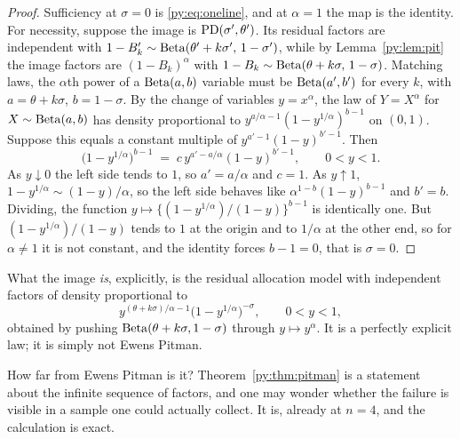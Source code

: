 \begin{proof}
Sufficiency at $\sigma = 0$ is \eqref{py:eq:oneline}, and at $\alpha = 1$ the map is the identity. For
necessity, suppose the image is $\mathrm{PD}(\sigma',\theta')$. Its residual factors are independent with
$1-B'_k \sim \mathrm{Beta}(\theta'+k\sigma',\,1-\sigma')$, while by Lemma~\ref{py:lem:pit} the image factors
are $(1-B_k)^{\alpha}$ with $1-B_k \sim \mathrm{Beta}(\theta+k\sigma,\,1-\sigma)$. Matching laws, the
$\alpha$th power of a $\mathrm{Beta}(a,b)$ variable must be $\mathrm{Beta}(a',b')$ for every $k$, with
$a = \theta+k\sigma$, $b = 1-\sigma$. By the change of variables $y = x^{\alpha}$, the law of
$Y = X^{\alpha}$ for $X \sim \mathrm{Beta}(a,b)$ has density proportional to
$y^{a/\alpha-1}(1-y^{1/\alpha})^{b-1}$ on $(0,1)$. Suppose this equals a constant multiple of
$y^{a'-1}(1-y)^{b'-1}$. Then
\[
\big(1-y^{1/\alpha}\big)^{b-1} \;=\; c\,y^{a'-a/\alpha}(1-y)^{b'-1},
\qquad 0 < y < 1 .
\]
As $y \downarrow 0$ the left side tends to $1$, so $a' = a/\alpha$ and $c = 1$. As $y \uparrow 1$,
$1-y^{1/\alpha} \sim (1-y)/\alpha$, so the left side behaves like $\alpha^{1-b}(1-y)^{b-1}$ and
$b' = b$. Dividing, the function $y \mapsto \{(1-y^{1/\alpha})/(1-y)\}^{b-1}$ is identically one. But
$(1-y^{1/\alpha})/(1-y)$ tends to $1$ at the origin and to $1/\alpha$ at the other end, so for
$\alpha \ne 1$ it is not constant, and the identity forces $b-1 = 0$, that is $\sigma = 0$.
\end{proof}

What the image \emph{is}, explicitly, is the residual allocation model with independent factors of
density proportional to
\begin{equation}
y^{(\theta+k\sigma)/\alpha - 1}\big(1 - y^{1/\alpha}\big)^{-\sigma},
\qquad 0 < y < 1,
\label{py:eq:image}
\end{equation}
obtained by pushing $\mathrm{Beta}(\theta+k\sigma, 1-\sigma)$ through $y \mapsto y^{\alpha}$. It is a
perfectly explicit law; it is simply not Ewens Pitman.

How far from Ewens Pitman is it? Theorem~\ref{py:thm:pitman} is a statement about the infinite
sequence of factors, and one may wonder whether the failure is visible in a sample one could
actually collect. It is, already at $n = 4$, and the calculation is exact.

